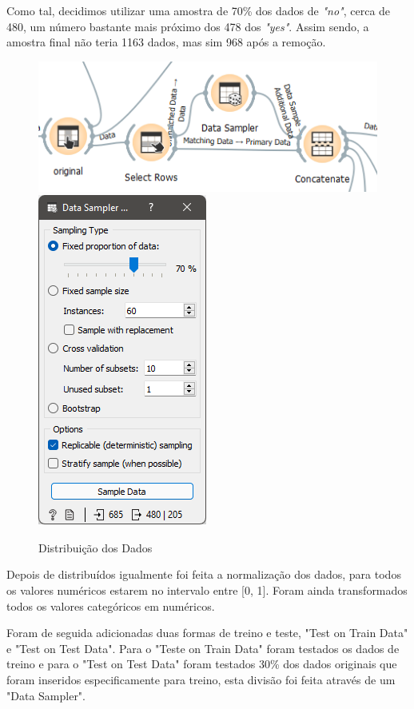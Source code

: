 Como tal, decidimos utilizar uma amostra de 70\% dos dados de \textit{"no"}, cerca de 480, um número bastante mais próximo dos 478 dos \textit{"yes"}. Assim sendo, a amostra final não teria 1163 dados, mas sim 968 após a remoção.

\begin{figure}[H]
    \centering
    \includegraphics[scale=0.6]{images/distribuicao.png}
    \includegraphics[scale=0.6]{images/sampleroriginal.png}
     \caption{Distribuição dos Dados}
\end{figure}

Depois de distribuídos igualmente foi feita a normalização dos dados, para todos os valores numéricos estarem no intervalo entre [0, 1]. Foram ainda transformados todos os valores categóricos em numéricos.

Foram de seguida adicionadas duas formas de treino e teste, "Test on Train Data" e "Test on Test Data". Para o "Teste on Train Data" foram testados os dados de treino e para o "Test on Test Data" foram testados 30\% dos dados originais que foram inseridos especificamente para treino, esta divisão foi feita através de um "Data Sampler".


